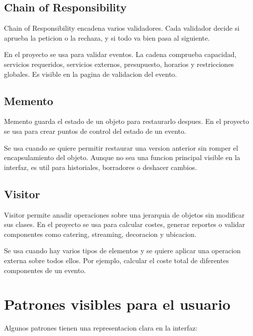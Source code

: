 \documentclass[12pt,a4paper]{article}
\begin{document}
\subsection{Chain of Responsibility}

Chain of Responsibility encadena varios validadores. Cada validador decide si aprueba la peticion o la rechaza, y si todo va bien pasa al siguiente.

En el proyecto se usa para validar eventos. La cadena comprueba capacidad, servicios requeridos, servicios externos, presupuesto, horarios y restricciones globales. Es visible en la pagina de validacion del evento.

\subsection{Memento}

Memento guarda el estado de un objeto para restaurarlo despues. En el proyecto se usa para crear puntos de control del estado de un evento.

Se usa cuando se quiere permitir restaurar una version anterior sin romper el encapsulamiento del objeto. Aunque no sea una funcion principal visible en la interfaz, es util para historiales, borradores o deshacer cambios.

\subsection{Visitor}

Visitor permite anadir operaciones sobre una jerarquia de objetos sin modificar sus clases. En el proyecto se usa para calcular costes, generar reportes o validar componentes como catering, streaming, decoracion y ubicacion.

Se usa cuando hay varios tipos de elementos y se quiere aplicar una operacion externa sobre todos ellos. Por ejemplo, calcular el coste total de diferentes componentes de un evento.

\section{Patrones visibles para el usuario}

Algunos patrones tienen una representacion clara en la interfaz:
\end{document}
